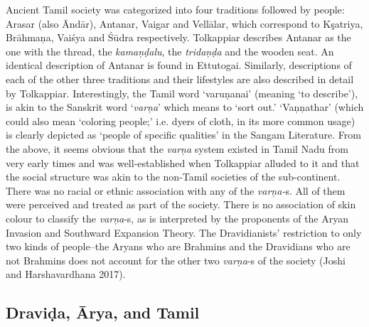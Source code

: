 Ancient Tamil society was categorized into four traditions followed by people: Arasar (also Āndār), Antanar, Vaigar and Vellālar, which correspond to Kşatriya, Brāhmaņa, Vaiśya and Śūdra respectively. Tolkappiar describes Antanar as the one with the thread, the \textit{kamaņḍalu}, the \textit{tridaņḍa} and the wooden seat. An identical description of Antanar is found in Ettutogai. Similarly, descriptions of each of the other three traditions and their lifestyles are also described in detail by Tolkappiar. Interestingly, the Tamil word ‘varuṇanai’ (meaning ‘to describe’), is akin to the Sanskrit word ‘\textit{varņa}’ which means to ‘sort out.’ ‘Vaņņathar’ (which could also mean ‘coloring people;’ i.e. dyers of cloth, in its more common usage) is clearly depicted as ‘people of specific qualities’ in the Sangam Literature. From the above, it seems obvious that the \textit{varņa} system existed in Tamil Nadu from very early times and was well-established when Tolkappiar alluded to it and that the social structure was akin to the non-Tamil societies of the sub-continent. There was no racial or ethnic association with any of the \textit{varņa-}s. All of them were perceived and treated as part of the society. There is no association of skin colour to classify the \textit{varņa}-s, as is interpreted by the proponents of the Aryan Invasion and Southward Expansion Theory. The Dravidianists’ restriction to only two kinds of people--the Aryans who are Brahmins and the Dravidians who are not Brahmins does not account for the other two \textit{varņa}-s of the society (Joshi and Harshavardhana 2017).


\subsection*{Draviḍa, Ārya, and Tamil}

